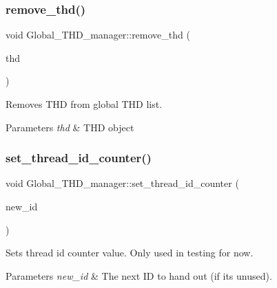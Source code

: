 \subsubsection{\texorpdfstring{remove\+\_\+thd()}{remove\_thd()}}
{\footnotesize\ttfamily void Global\+\_\+\+T\+H\+D\+\_\+manager\+::remove\+\_\+thd (\begin{DoxyParamCaption}\item[{T\+HD $\ast$}]{thd }\end{DoxyParamCaption})}

Removes T\+HD from global T\+HD list.


\begin{DoxyParams}{Parameters}
{\em thd} & T\+HD object \\
\hline
\end{DoxyParams}
\mbox{\label{classGlobal__THD__manager_ab82aa13615fd9bf44dea89589773c61e}} 
\subsubsection{\texorpdfstring{set\+\_\+thread\+\_\+id\+\_\+counter()}{set\_thread\_id\_counter()}}
{\footnotesize\ttfamily void Global\+\_\+\+T\+H\+D\+\_\+manager\+::set\+\_\+thread\+\_\+id\+\_\+counter (\begin{DoxyParamCaption}\item[{my\+\_\+thread\+\_\+id}]{new\+\_\+id }\end{DoxyParamCaption})}

Sets thread id counter value. Only used in testing for now. 
\begin{DoxyParams}{Parameters}
{\em new\+\_\+id} & The next ID to hand out (if it\textquotesingle{}s unused). \\
\hline
\end{DoxyParams}
\mbox{\label{classGlobal__THD__manager_a52d3e196c17357f3d5acea3c8aca6f02}} 
